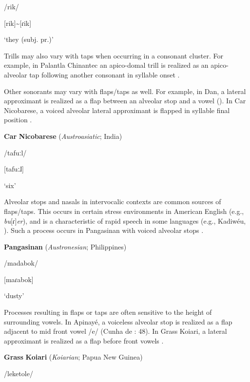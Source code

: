 /rik/

[rik]{\textasciitilde}[ɾik]

\glt ‘they (subj. pr.)’

\citep[14]{Beaumont1979}

\z

Trills may also vary with taps when occurring in a consonant cluster. For example, in Palantla Chinantec an apico-domal trill is realized as an apico-alveolar tap following another consonant in syllable onset \citep[3]{Merrifield1963}. 

  Other sonorants may vary with flaps/taps as well. For example, in Dan, a lateral approximant is realized as a flap between an alveolar stop and a vowel (\citealt{BearthZemp1967}). In Car Nicobarese, a voiced alveolar lateral approximant is flapped in syllable final position .

\ea\label{ex:(4.53)}
  \textbf{Car} \textbf{Nicobarese} (\textit{Austroasiatic}; India)

/tafuːl/

[tafuːɺ]

\glt ‘six’

\citep[45]{Braine1970}

\z

  Alveolar stops and nasals in intervocalic contexts are common sources of flaps/taps. This occurs in certain stress environments in American English (e.g., \textit{bu}[ɾ]\textit{er}), and is a characteristic of rapid speech in some languages (e.g., Kadiwéu, \citealt{Sandalo1997}). Such a process occurs in Pangasinan with voiced alveolar stops .

\ea\label{ex:(4.54)}
  \textbf{Pangasinan} (\textit{Austronesian}; Philippines)

/madabok/

[maɾabok]

\glt ‘dusty’

\citep[18]{Benton1971}

\z

  Processes resulting in flaps or taps are often sensitive to the height of surrounding vowels. In Apinayé, a voiceless alveolar stop is realized as a flap adjacent to mid front vowel /e/ (Cunha de \citealt{Oliveira2005}: 48). In Grass Koiari, a lateral approximant is realized as a flap before front vowels .

\ea\label{ex:(4.55)}
  \textbf{Grass} \textbf{Koiari} (\textit{Koiarian}; Papua New Guinea)

/leketole/

